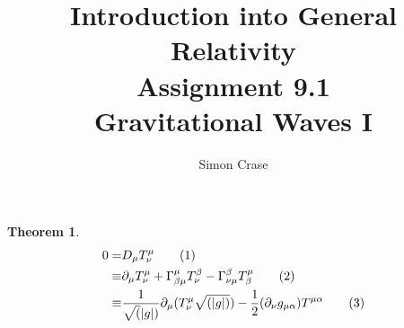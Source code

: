 \documentclass[]{article}
\title{Introduction into General Relativity\\Assignment 9.1\\Gravitational Waves I}
\author{Simon Crase}
\newtheorem{theorem}{Theorem}
\newcommand\numberthis{\addtocounter{equation}{1}\tag{\theequation}}
\begin{document}
\maketitle


\begin{theorem}
	\begin{align*}
	0 =& D_{\mu} T^{\mu}_{\nu} \numberthis\label{eq:continuity} \\
	\equiv & \partial_{\mu} T^{\mu}_{\nu} + \Gamma^{\mu}_{\beta\mu}T^{\beta}_{\nu}-\Gamma^{\beta}_{\nu\mu}T^{\mu}_{\beta} \numberthis\label{eq:covariant-derivative}\\
	\equiv& \frac{1}{\sqrt(|g|)}\partial_{\mu}(T^{\mu}_{\nu}\sqrt{(|g|)}) - \frac{1}{2}(\partial_{\nu}g_{\mu\alpha})T^{\mu\alpha} \numberthis\label{eq:final}
	\end{align*}
\end{theorem}
\end{document}
